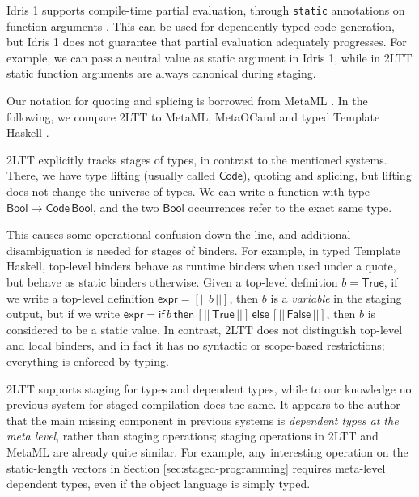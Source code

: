 \documentclass[acmsmall,anonymous,review]{acmart}
\newcommand{\msf}[1]{\mathsf{#1}}
\newcommand{\Bool}{\msf{Bool}}
\newcommand{\True}{\msf{True}}
\newcommand{\False}{\msf{False}}
\theoremstyle{remark}
\begin{document}

Idris 1 supports compile-time partial evaluation, through \texttt{static}
annotations on function arguments \cite{scrap-your-inefficient-engine}. This can
be used for dependently typed code generation, but Idris 1 does not guarantee
that partial evaluation adequately progresses. For example, we can pass a neutral
value as static argument in Idris 1, while in 2LTT static function arguments
are always canonical during staging.

Our notation for quoting and splicing is borrowed from MetaML \cite{metaml}.  In
the following, we compare 2LTT to MetaML, MetaOCaml \cite{kiselyov14metaocaml}
and typed Template Haskell \cite{typed-th}.

2LTT explicitly tracks stages of types, in contrast to the mentioned
systems. There, we have type lifting (usually called $\msf{Code}$), quoting and
splicing, but lifting does not change the universe of types. We can write a
function with type $\Bool \to \msf{Code}\,\Bool$, and the two $\Bool$
occurrences refer to the exact same type.

This causes some operational confusion down the line, and additional
disambiguation is needed for stages of binders. For example, in typed Template
Haskell, top-level binders behave as runtime binders when used under a quote,
but behave as static binders otherwise. Given a top-level definition $b =
\True$, if we write a top-level definition $\msf{expr} = [||\,b\,||]$, then $b$
is a \emph{variable} in the staging output, but if we write $\msf{expr} =
\msf{if}\,b\,\msf{then}\,[||\,\True\,||]\,\msf{else}\,[||\,\False\,||]$, then
$b$ is considered to be a static value. In contrast, 2LTT does not distinguish
top-level and local binders, and in fact it has no syntactic or scope-based
restrictions; everything is enforced by typing.

2LTT supports staging for types and dependent types, while to our knowledge no
previous system for staged compilation does the same. It appears to the author
that the main missing component in previous systems is \emph{dependent types at
the meta level}, rather than staging operations; staging operations in 2LTT and
MetaML are already quite similar. For example, any interesting operation on
the static-length vectors in Section \ref{sec:staged-programming} requires
meta-level dependent types, even if the object language is simply typed.
\end{document}
